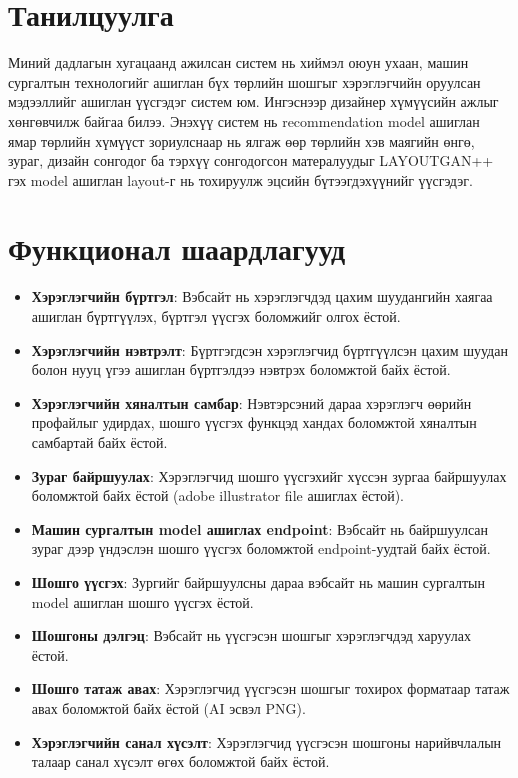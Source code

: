 \section{Танилцуулга}
Миний дадлагын хугацаанд ажилсан систем нь хиймэл оюун ухаан, машин сургалтын технологийг ашиглан бүх төрлийн шошгыг хэрэглэгчийн оруулсан мэдээллийг ашиглан үүсгэдэг систем юм. Ингэснээр дизайнер хүмүүсийн ажлыг хөнгөвчилж байгаа билээ. Энэхүү систем нь recommendation model ашиглан ямар төрлийн хүмүүст зориулснаар нь ялгаж өөр төрлийн хэв маягийн өнгө, зураг, дизайн сонгодог ба тэрхүү сонгодогсон матералуудыг LAYOUTGAN++ гэх model ашиглан layout-г нь тохируулж эцсийн бүтээгдэхүүнийг үүсгэдэг.
\section{Функционал шаардлагууд}
\begin{itemize}
	\item \textbf{Хэрэглэгчийн бүртгэл}: Вэбсайт нь хэрэглэгчдэд цахим шуудангийн хаягаа ашиглан бүртгүүлэх, бүртгэл үүсгэх боломжийг олгох ёстой.

	\item \textbf{Хэрэглэгчийн нэвтрэлт}: Бүртгэгдсэн хэрэглэгчид бүртгүүлсэн цахим шуудан болон нууц үгээ ашиглан бүртгэлдээ нэвтрэх боломжтой байх ёстой.

	\item \textbf{Хэрэглэгчийн хяналтын самбар}: Нэвтэрсэний дараа хэрэглэгч өөрийн профайлыг удирдах, шошго үүсгэх функцэд хандах боломжтой хяналтын самбартай байх ёстой.

	\item \textbf{Зураг байршуулах}: Хэрэглэгчид шошго үүсгэхийг хүссэн зургаа байршуулах боломжтой байх ёстой (adobe illustrator file ашиглах ёстой).

	\item \textbf{Машин сургалтын model ашиглах endpoint}: Вэбсайт нь байршуулсан зураг дээр үндэслэн шошго үүсгэх боломжтой endpoint-уудтай байх ёстой.

	\item \textbf{Шошго үүсгэх}: Зургийг байршуулсны дараа вэбсайт нь машин сургалтын model ашиглан шошго үүсгэх ёстой.

	\item \textbf{Шошгоны дэлгэц}: Вэбсайт нь үүсгэсэн шошгыг хэрэглэгчдэд харуулах ёстой.

	\item \textbf{Шошго татаж авах}: Хэрэглэгчид үүсгэсэн шошгыг тохирох форматаар татаж авах боломжтой байх ёстой (AI эсвэл PNG).

	\item \textbf{Хэрэглэгчийн санал хүсэлт}: Хэрэглэгчид үүсгэсэн шошгоны нарийвчлалын талаар санал хүсэлт өгөх боломжтой байх ёстой.
\end{itemize}
